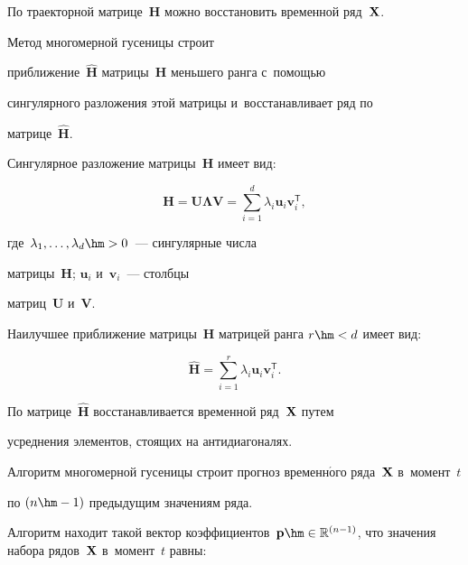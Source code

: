 По траекторной матрице~$\mathbf{H}$ можно восстановить временной ряд~${\bf X}$.

Метод многомерной гусеницы строит

приближение~$\hat{\mathbf{H}}$ мат\-ри\-цы~$\mathbf{H}$ меньшего ранга с~по\-мощью 

сингулярного разложения этой мат\-ри\-цы и~восстанавливает ряд по 

мат\-ри\-це~$\hat{\mathbf{H}}$.

Сингулярное разложение матрицы~$\mathbf{H}$ имеет вид:

\begin{equation}

\label{svd}

\mathbf{H} = \mathbf{U}\mathbf{\Lambda} \mathbf{V} = \sum\limits_{i = 1}^{d}{\lambda_i 

\mathbf{u}_i\mathbf{v}_i^{\mathsf{T}}},

\end{equation}

где~$\lambda_1, \ldots, \lambda_d \hm> 0$~--- сингулярные числа 

матрицы~$\mathbf{H}$; $\mathbf{u}_i$ и~$\mathbf{v}_i$~--- столбцы 

матриц~$\mathbf{U}$ и~$\mathbf{V}$.

Наилучшее приближение матрицы~$\mathbf{H}$ матрицей ранга $r\hm < d$ имеет вид:

\begin{equation}

\label{svd_approx}

\hat{\mathbf{H}} = \sum\limits_{i = 1}^{r}{\lambda_i \mathbf{u}_i 

\mathbf{v}_i^{\mathsf{T}}}.

\end{equation}



По матрице~$\hat{\mathbf{H}}$ восстанавливается временной ряд~${\bf X}$ путем 

усреднения элементов, стоящих на антидиагоналях.



Алгоритм многомерной гусеницы строит прогноз временн$\acute{\mbox{о}}$го ряда~$\mathbf{X}$ в~момент~$t$ 

по $(n \hm- 1)$ предыдущим значениям ряда.

Алгоритм находит такой вектор коэффициентов~$\mathbf{p} \hm\in \mathbb{R}^{(n - 

1)}$, что значения набора рядов~${\bf X}$ в~момент~$t$ равны:

